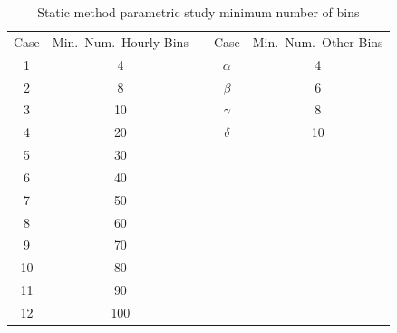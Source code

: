 \documentclass[review,12pt]{elsarticle}
\begin{document}
\begin{table}[htbp!]
\centering
\caption{Static method parametric study minimum number of bins}
\label{tab:staic case nums}
\begin{tabular}{|c|c|ccc}
\cline{1-2} \cline{4-5}
Case & Min.~Num.~Hourly Bins & \multicolumn{1}{c|}{} & \multicolumn{1}{c|}{Case}                  & \multicolumn{1}{c|}{Min.~Num.~Other Bins} \\ \cline{1-2} \cline{4-5} 
1    & 4                     & \multicolumn{1}{c|}{} & \multicolumn{1}{c|}{$\alpha$} & \multicolumn{1}{c|}{4}                    \\ \cline{1-2} \cline{4-5} 
2    & 8                     & \multicolumn{1}{c|}{} & \multicolumn{1}{c|}{$\beta$}  & \multicolumn{1}{c|}{6}                    \\ \cline{1-2} \cline{4-5} 
3    & 10                    & \multicolumn{1}{c|}{} & \multicolumn{1}{c|}{$\gamma$} & \multicolumn{1}{c|}{8}                    \\ \cline{1-2} \cline{4-5} 
4    & 20                    & \multicolumn{1}{c|}{} & \multicolumn{1}{c|}{$\delta$} & \multicolumn{1}{c|}{10}                   \\ \cline{1-2} \cline{4-5} 
5    & 30                    &                       &                                            &                                           \\ \cline{1-2}
6    & 40                    &                       &                                            &                                           \\ \cline{1-2}
7    & 50                    &                       &                                            &                                           \\ \cline{1-2}
8    & 60                    &                       &                                            &                                           \\ \cline{1-2}
9    & 70                    &                       &                                            &                                           \\ \cline{1-2}
10   & 80                    &                       &                                            &                                           \\ \cline{1-2}
11   & 90                    &                       &                                            &                                           \\ \cline{1-2}
12   & 100                   &                       &                                            &                                           \\ \cline{1-2}
\end{tabular}
\end{table}
\end{document}
